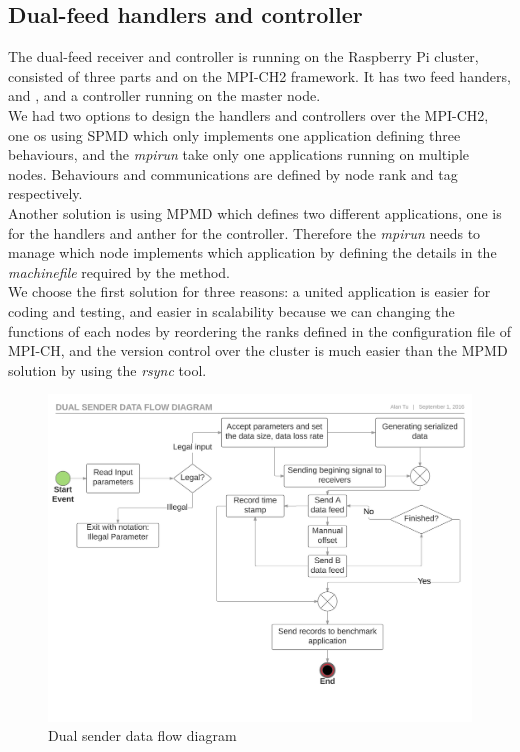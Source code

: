\documentclass[11pt,openright,a4paper]{report}
\begin{document}
\subsection{Dual-feed handlers and controller}
The dual-feed receiver and controller is running on the Raspberry Pi cluster, consisted of three parts and on the MPI-CH2 framework. It has two feed handers,  and , and a controller running on the master node.\\
We had two options to design the handlers and controllers over the MPI-CH2, one os using SPMD which only implements one application defining three behaviours, and the \textit{mpirun} take only one applications running on multiple nodes. Behaviours and communications are defined by node rank and tag respectively. \\
Another solution is using MPMD which defines two different applications, one is for the handlers and anther for the controller. Therefore the \textit{mpirun} needs to manage which node implements which application by defining the details in the \textit{machinefile} required by the method.\\
We choose the first solution for three reasons: a united application is easier for coding and testing, and easier in scalability because we can changing the functions of each nodes by reordering the ranks defined in the configuration file of MPI-CH, and the version control over the cluster is much easier than the MPMD solution by using the \textit{rsync} tool.\\
\begin{figure}[H]
	\centering
	\includegraphics[width=1.0\linewidth]{"picture/Dual sender data flow diagram - Page 1"}
	\caption{Dual sender data flow diagram}
	\label{fig:Dualsenderdataflowdiagram-Page1}
\end{figure}
\end{document}
